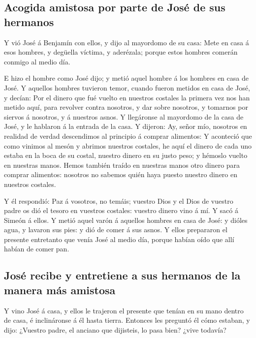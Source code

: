 \hypertarget{acogida-amistosa-por-parte-de-josuxe9-de-sus-hermanos}{%
\subsection{Acogida amistosa por parte de José de sus
hermanos}\label{acogida-amistosa-por-parte-de-josuxe9-de-sus-hermanos}}

 Y vió José á Benjamín con ellos, y dijo al mayordomo de su
casa: Mete en casa á esos hombres, y degüella víctima, y aderézala;
porque estos hombres comerán conmigo al medio día.

 E hizo el hombre como José dijo; y metió aquel hombre á
los hombres en casa de José.  Y aquellos hombres tuvieron
temor, cuando fueron metidos en casa de José, y decían: Por el dinero
que fué vuelto en nuestros costales la primera vez nos han metido aquí,
para revolver contra nosotros, y dar sobre nosotros, y tomarnos por
siervos á nosotros, y á nuestros asnos.  Y llegáronse al
mayordomo de la casa de José, y le hablaron á la entrada de la casa.
 Y dijeron: Ay, señor mío, nosotros en realidad de verdad
descendimos al principio á comprar alimentos:  Y aconteció
que como vinimos al mesón y abrimos nuestros costales, he aquí el dinero
de cada uno estaba en la boca de su costal, nuestro dinero en su justo
peso; y hémoslo vuelto en nuestras manos.  Hemos también
traído en nuestras manos otro dinero para comprar alimentos: nosotros no
sabemos quién haya puesto nuestro dinero en nuestros costales.

 Y él respondió: Paz á vosotros, no temáis; vuestro Dios y
el Dios de vuestro padre os dió el tesoro en vuestros costales: vuestro
dinero vino á mí. Y sacó á Simeón á ellos.  Y metió aquel
varón á aquellos hombres en casa de José: y dióles agua, y lavaron sus
pies: y dió de comer á sus asnos.  Y ellos prepararon el
presente entretanto que venía José al medio día, porque habían oído que
allí habían de comer pan.

\hypertarget{josuxe9-recibe-y-entretiene-a-sus-hermanos-de-la-manera-muxe1s-amistosa}{%
\subsection{José recibe y entretiene a sus hermanos de la manera más
amistosa}\label{josuxe9-recibe-y-entretiene-a-sus-hermanos-de-la-manera-muxe1s-amistosa}}

 Y vino José á casa, y ellos le trajeron el presente que
tenían en su mano dentro de casa, é inclináronse á él hasta tierra.
 Entonces les preguntó él cómo estaban, y dijo: ¿Vuestro
padre, el anciano que dijisteis, lo pasa bien? ¿vive todavía?

